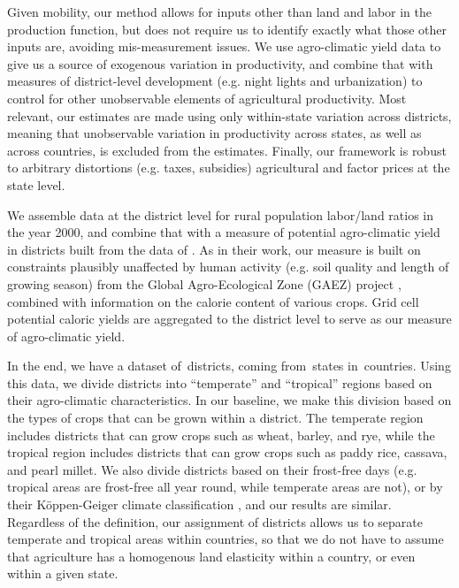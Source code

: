 \documentclass[11pt]{article}
\begin{document}
Given mobility, our method allows for inputs other than land and labor in the production function, but does not require us to identify exactly what those other inputs are, avoiding mis-measurement issues. We use agro-climatic yield data to give us a source of exogenous variation in productivity, and combine that with measures of district-level development (e.g. night lights and urbanization) to control for other unobservable elements of agricultural productivity. Most relevant, our estimates are made using only within-state variation across districts, meaning that unobservable variation in productivity across states, as well as across countries, is excluded from the estimates. Finally, our framework is robust to arbitrary distortions (e.g. taxes, subsidies) agricultural and factor prices at the state level.

We assemble data at the district level for rural population labor/land ratios in the year 2000, and combine that with a measure of potential agro-climatic yield in districts built from the data of \citet{galorozak2016}. As in their work, our measure is built on constraints plausibly unaffected by human activity (e.g. soil quality and length of growing season) from the Global Agro-Ecological Zone (GAEZ) project \citep{gaez}, combined with information on the calorie content of various crops. Grid cell potential caloric yields are aggregated to the district level to serve as our measure of agro-climatic yield.

In the end, we have a dataset of\districts \ districts, coming from\provinces \ states in\countries \ countries. Using this data, we divide districts into ``temperate'' and ``tropical'' regions based on their agro-climatic characteristics. In our baseline, we make this division based on the types of crops that can be grown within a district. The temperate region includes districts that can grow crops such as wheat, barley, and rye, while the tropical region includes districts that can grow crops such as paddy rice, cassava, and pearl millet. We also divide districts based on their frost-free days (e.g. tropical areas are frost-free all year round, while temperate areas are not), or by their K{\"o}ppen-Geiger climate classification \citep{kottek2006}, and our results are similar. Regardless of the definition, our assignment of districts allows us to separate temperate and tropical areas within countries, so that we do not have to assume that agriculture has a homogenous land elasticity within a country, or even within a given state. 
\end{document}
